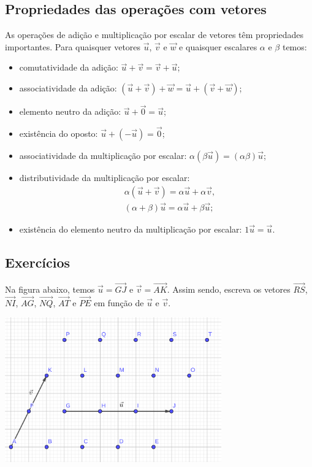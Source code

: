 \subsection{Propriedades das operações com vetores}

As operações de adição e multiplicação por escalar de vetores têm propriedades importantes. Para quaisquer vetores $\vec{u}$, $\vec{v}$ e $\vec{w}$ e quaisquer escalares $\alpha$ e $\beta$ temos:
\begin{itemize}
\item comutatividade da adição: $\vec{u}+\vec{v}=\vec{v}+\vec{u}$;
\item associatividade da adição: $(\vec{u} + \vec{v}) + \vec{w} = \vec{u} + (\vec{v} + \vec{w})$;
\item elemento neutro da adição: $\vec{u}+\vec{0}=\vec{u}$;
\item existência do oposto: $\vec{u}+(-\vec{u}) = \vec{0}$;
\item associatividade da multiplicação por escalar: $\alpha(\beta\vec{u})=(\alpha\beta)\vec{u}$;
\item distributividade da multiplicação por escalar:
  \begin{align}
    &\alpha(\vec{u}+\vec{v}) = \alpha\vec{u}+\alpha\vec{v},\\
    &(\alpha+\beta)\vec{u} = \alpha\vec{u}+\beta\vec{u};
  \end{align}
\item existência do elemento neutro da multiplicação por escalar: $1\vec{u}=\vec{u}$.
\end{itemize}

\subsection*{Exercícios}

\begin{exer}\label{exer:vetor_prob_01}
  Na figura abaixo, temos $\vec{u} = \overrightarrow{GJ}$ e $\vec{v} = \overrightarrow{AK}$. Assim sendo, escreva os vetores $\overrightarrow{RS}$, $\overrightarrow{NI}$, $\overrightarrow{AG}$, $\overrightarrow{NQ}$, $\overrightarrow{AT}$ e $\overrightarrow{PE}$ em função de $\vec{u}$ e $\vec{v}$.

  \includegraphics[width=0.7\textwidth]{./cap_vetor/dados/fig_exer_prob_01/fig_exer_prob_01}
\end{exer}

